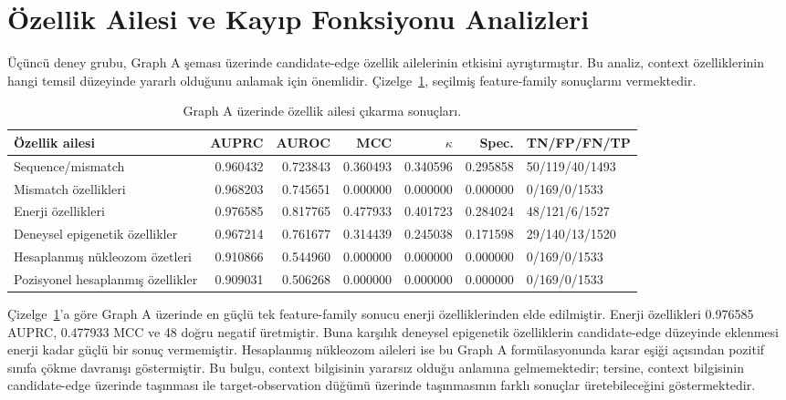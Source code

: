\section{Özellik Ailesi ve Kayıp Fonksiyonu Analizleri}

Üçüncü deney grubu, Graph A şeması üzerinde candidate-edge özellik ailelerinin etkisini ayrıştırmıştır. Bu analiz, context özelliklerinin hangi temsil düzeyinde yararlı olduğunu anlamak için önemlidir. Çizelge~\ref{tab:feature-family-ablation}, seçilmiş feature-family sonuçlarını vermektedir.

\begin{table}[htbp]
\caption{Graph A üzerinde özellik ailesi çıkarma sonuçları.}
\label{tab:feature-family-ablation}
\centering
\scriptsize
\begin{tabularx}{\textwidth}{>{\raggedright\arraybackslash}X r r r r r l}
\toprule\toprule
Özellik ailesi & AUPRC & AUROC & MCC & $\kappa$ & Spec. & TN/FP/FN/TP\\
\midrule
Sequence/mismatch & 0.960432 & 0.723843 & 0.360493 & 0.340596 & 0.295858 & 50/119/40/1493\\
Mismatch özellikleri & 0.968203 & 0.745651 & 0.000000 & 0.000000 & 0.000000 & 0/169/0/1533\\
Enerji özellikleri & 0.976585 & 0.817765 & 0.477933 & 0.401723 & 0.284024 & 48/121/6/1527\\
Deneysel epigenetik özellikler & 0.967214 & 0.761677 & 0.314439 & 0.245038 & 0.171598 & 29/140/13/1520\\
Hesaplanmış nükleozom özetleri & 0.910866 & 0.544960 & 0.000000 & 0.000000 & 0.000000 & 0/169/0/1533\\
Pozisyonel hesaplanmış özellikler & 0.909031 & 0.506268 & 0.000000 & 0.000000 & 0.000000 & 0/169/0/1533\\
\bottomrule
\end{tabularx}
\end{table}

Çizelge~\ref{tab:feature-family-ablation}'a göre Graph A üzerinde en güçlü tek feature-family sonucu enerji özelliklerinden elde edilmiştir. Enerji özellikleri 0.976585 AUPRC, 0.477933 MCC ve 48 doğru negatif üretmiştir. Buna karşılık deneysel epigenetik özelliklerin candidate-edge düzeyinde eklenmesi enerji kadar güçlü bir sonuç vermemiştir. Hesaplanmış nükleozom aileleri ise bu Graph A formülasyonunda karar eşiği açısından pozitif sınıfa çökme davranışı göstermiştir. Bu bulgu, context bilgisinin yararsız olduğu anlamına gelmemektedir; tersine, context bilgisinin candidate-edge üzerinde taşınması ile target-observation düğümü üzerinde taşınmasının farklı sonuçlar üretebileceğini göstermektedir.


